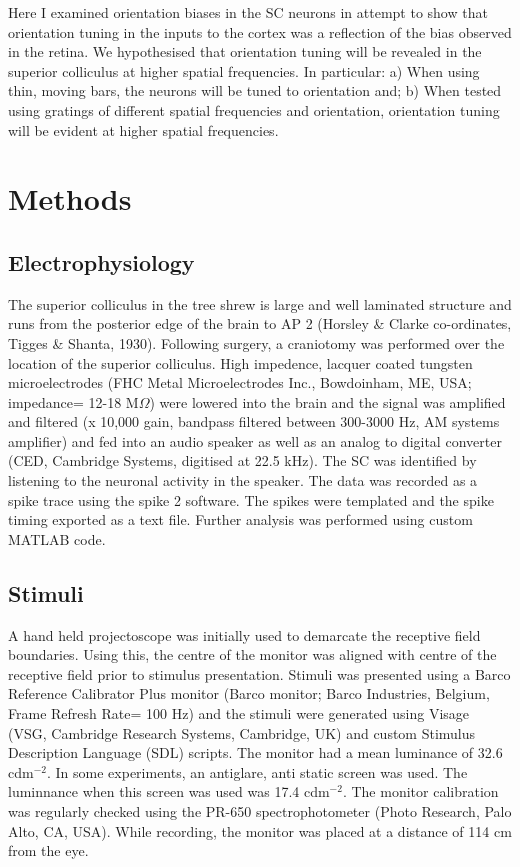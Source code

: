 	Here I examined orientation biases in the SC neurons in attempt to show that orientation tuning in the inputs to the cortex was a reflection of the bias observed in the retina. We hypothesised that orientation tuning will be revealed in the superior colliculus at higher spatial frequencies. In particular:
	a) When using thin, moving bars, the neurons will be tuned to orientation and;
	b) When tested using gratings of different spatial frequencies and orientation, orientation tuning will be evident at higher spatial frequencies.
	
	
	
	
	\section{Methods}
	\subsection{Electrophysiology}
	The superior colliculus in the tree shrew is large and well laminated structure and runs from the posterior edge of the brain to AP 2 (Horsley \& Clarke co-ordinates, Tigges \& Shanta, 1930). Following surgery, a craniotomy was performed over the location of the superior colliculus. High impedence, lacquer coated tungsten microelectrodes (FHC Metal Microelectrodes Inc., Bowdoinham, ME, USA; impedance= 12-18 M$\Omega$) were lowered into the brain and the signal was amplified and filtered (x 10,000 gain, bandpass filtered between 300-3000 Hz, AM systems amplifier) and fed into an audio speaker as well as an analog to digital converter (CED, Cambridge Systems, digitised at 22.5 kHz). The SC was identified by listening to the neuronal activity in the speaker. The data was recorded as a spike trace using the spike 2 software. The spikes were templated and the spike timing exported as a text file. Further analysis was performed using custom MATLAB code.
	
	\subsection{Stimuli}
	
	A hand held projectoscope was initially used to demarcate the receptive field boundaries. Using this, the centre of the monitor was aligned with centre of the receptive field prior to stimulus presentation. Stimuli was presented using a Barco Reference Calibrator Plus monitor (Barco monitor; Barco Industries, Belgium, Frame Refresh Rate= 100 Hz) and the stimuli were generated using Visage (VSG, Cambridge Research Systems, Cambridge, UK) and custom Stimulus Description Language (SDL) scripts. The monitor had a mean luminance of 32.6 cdm$^{-2}$. In some experiments, an antiglare, anti static screen was used. The luminnance when this screen was used was 17.4 cdm$^{-2}$. The monitor calibration was regularly checked using the PR-650 spectrophotometer (Photo Research, Palo Alto, CA, USA). While recording, the monitor was placed at a distance of 114 cm from the eye.
	
